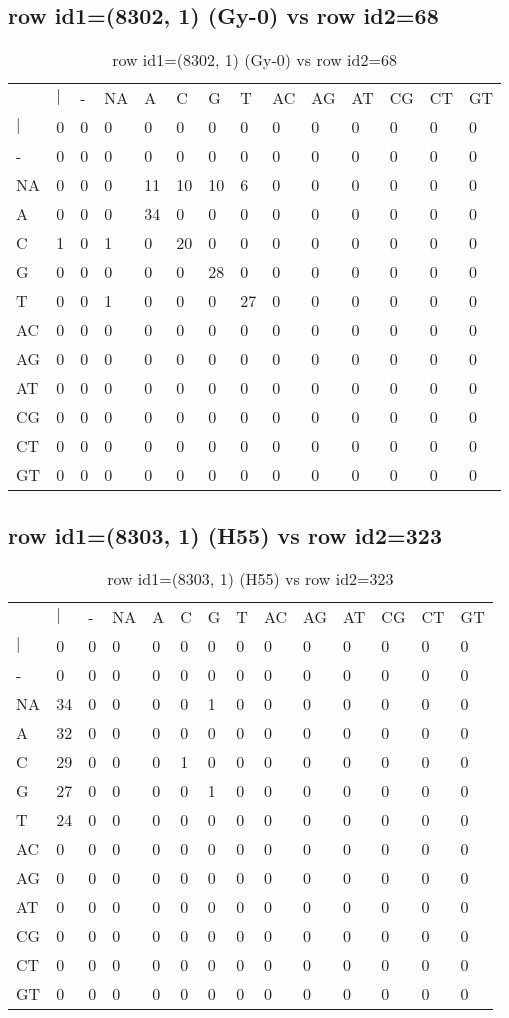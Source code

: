 \subsection{row id1=(8302, 1) (Gy-0) vs row id2=68}
\begin{center}
\begin{longtable}{|l|l|l|l|l|l|l|l|l|l|l|l|l|l|}
\caption{row id1=(8302, 1) (Gy-0) vs row id2=68} \label{table_dm288}\\
\hline
\\
\hline
&$|$&-&NA&A&C&G&T&AC&AG&AT&CG&CT&GT\\
$|$&0&0&0&0&0&0&0&0&0&0&0&0&0\\
-&0&0&0&0&0&0&0&0&0&0&0&0&0\\
NA&0&0&0&11&10&10&6&0&0&0&0&0&0\\
A&0&0&0&34&0&0&0&0&0&0&0&0&0\\
C&1&0&1&0&20&0&0&0&0&0&0&0&0\\
G&0&0&0&0&0&28&0&0&0&0&0&0&0\\
T&0&0&1&0&0&0&27&0&0&0&0&0&0\\
AC&0&0&0&0&0&0&0&0&0&0&0&0&0\\
AG&0&0&0&0&0&0&0&0&0&0&0&0&0\\
AT&0&0&0&0&0&0&0&0&0&0&0&0&0\\
CG&0&0&0&0&0&0&0&0&0&0&0&0&0\\
CT&0&0&0&0&0&0&0&0&0&0&0&0&0\\
GT&0&0&0&0&0&0&0&0&0&0&0&0&0\\
\hline
\end{longtable}
\end{center}

\subsection{row id1=(8303, 1) (H55) vs row id2=323}
\begin{center}
\begin{longtable}{|l|l|l|l|l|l|l|l|l|l|l|l|l|l|}
\caption{row id1=(8303, 1) (H55) vs row id2=323} \label{table_dm290}\\
\hline
\\
\hline
&$|$&-&NA&A&C&G&T&AC&AG&AT&CG&CT&GT\\
$|$&0&0&0&0&0&0&0&0&0&0&0&0&0\\
-&0&0&0&0&0&0&0&0&0&0&0&0&0\\
NA&34&0&0&0&0&1&0&0&0&0&0&0&0\\
A&32&0&0&0&0&0&0&0&0&0&0&0&0\\
C&29&0&0&0&1&0&0&0&0&0&0&0&0\\
G&27&0&0&0&0&1&0&0&0&0&0&0&0\\
T&24&0&0&0&0&0&0&0&0&0&0&0&0\\
AC&0&0&0&0&0&0&0&0&0&0&0&0&0\\
AG&0&0&0&0&0&0&0&0&0&0&0&0&0\\
AT&0&0&0&0&0&0&0&0&0&0&0&0&0\\
CG&0&0&0&0&0&0&0&0&0&0&0&0&0\\
CT&0&0&0&0&0&0&0&0&0&0&0&0&0\\
GT&0&0&0&0&0&0&0&0&0&0&0&0&0\\
\hline
\end{longtable}
\end{center}

